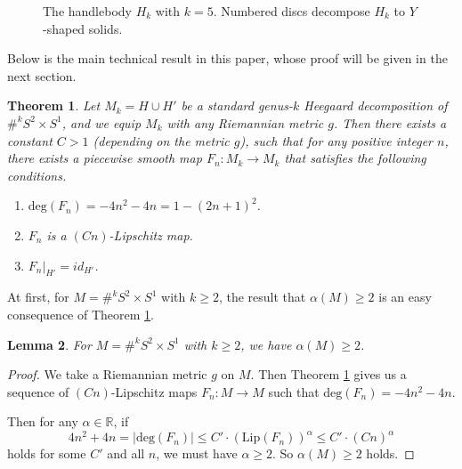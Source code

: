 \documentclass{amsart}
\newtheorem{thm}{Theorem}[section]
\newtheorem{lem}[thm]{Lemma}
\begin{document}
\begin{figure}[htbp]
    \centering
    \def\svgwidth{4in} %
   
    \caption{The handlebody $H_k$ with $k=5$. Numbered discs decompose $H_k$ to $Y$-shaped solids.}
     \label{Figure1}
\end{figure}


Below  is the main technical result in this paper, whose proof will be given in the next section.
\begin{thm}\label{technical}
Let $M_k=H\cup H'$ be a standard genus-$k$ Heegaard decomposition of $\#^k S^2\times S^1$, and we equip $M_k$ with any Riemannian metric $g$. Then there exists a constant $C>1$ (depending on the metric $g$), such that for any positive integer $n$, there exists a piecewise smooth map $F_n:M_k\to M_k$ that satisfies the following conditions.
\begin{enumerate}
\item $\text{deg}(F_n)=-4n^2-4n=1-(2n+1)^2$.
\item $F_n$ is a $(Cn)$-Lipschitz map.
\item $F_n|_{H'}=id_{H'}$.
\end{enumerate}
\end{thm}



At first, for $M=\#^k S^2\times S^1$ with $k\geq 2$, the result that $\alpha(M)\geq 2$ is an easy consequence of Theorem \ref{technical}.

\begin{lem}\label{easy}
For $M=\#^k S^2\times S^1$ with $k\geq 2$, we have $\alpha(M)\geq 2$.
\end{lem}

\begin{proof}
We take a Riemannian metric $g$ on $M$. Then Theorem \ref{technical} gives us a sequence of $(Cn)$-Lipschitz maps $F_n:M\to M$ such that $\text{deg}(F_n)=-4n^2-4n$.

Then for any $\alpha\in \mathbb{R}$, if $$4n^2+4n=|\text{deg}(F_n)|\leq C'\cdot (\text{Lip}(F_n))^{\alpha}\leq C'\cdot (Cn)^{\alpha}$$ holds for some $C'$ and all $n$, we must have $\alpha\geq 2$. So $\alpha(M)\geq 2$ holds.
\end{proof}
\end{document}
